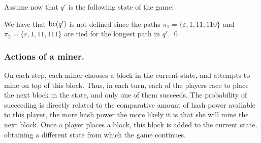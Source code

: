 \begin{example}
	Assume now that $q'$ is the following state of the game:
	\begin{center}
\end{center}
We have that $\text{bc}(q')$ is not defined since the paths $\pi_1 = \{\varepsilon, 1, 11, 110\}$ and $\pi_2 = \{\varepsilon, 1, 11, 111\}$ are tied for the longest path in $q'$. \qed
\end{example}



\subsubsection{Actions of a miner.}\label{sub:actions}
On each step, each miner
chooses a block in the current state, and attempts to mine on top of this block. Thus, in each turn, each of the players race to place the next block in the state, and only one of them succeeds. The probability of succeeding is directly related to the comparative amount of hash power available to this player, the more hash power the more likely it is that she will mine the next block. %
Once a player places a block, this block is added to the current state, obtaining a different state from which the game continues.

